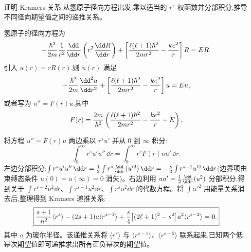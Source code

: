 \begin{question}
证明 Kramers 关系:从氢原子径向方程出发,乘以适当的 $r^s$ 权函数并分部积分,推导不同径向期望值之间的递推关系。
\end{question}
\begin{solution}
氢原子的径向方程为
\[
-{\hbar^2\over2m}{1\over r^2}{\dd\over\dd r}\left(r^2{\dd R\over\dd r}\right)
+ \left[{\ell(\ell+1)\hbar^2\over2mr^2} - {ke^2\over r}\right]R = E R.
\]
引入 $u(r)=rR(r)$,则 $u(r)$ 满足
\[
-{\hbar^2\over2m}{\dd^2 u\over\dd r^2} + \left[{\ell(\ell+1)\hbar^2\over2mr^2} - {ke^2\over r}\right]u = E u,
\]
或者写为 $u'' = F(r)u$,其中
\[
F(r) = {2m\over\hbar^2}\left({\ell(\ell+1)\hbar^2\over2mr^2} - {ke^2\over r} - E\right).
\]

将方程 $u'' = F(r)u$ 两边乘以 $r^s u'$ 并从 $0$ 到 $\infty$ 积分:
\[
\int_0^\infty r^s u' u''\,\dd r = \int_0^\infty r^s F(r) u u'\,\dd r.
\]
左边分部积分:$\int r^s u' u''\,\dd r = {1\over2}\int r^s {\dd\over\dd r}(u'^2)\,\dd r = -{s\over2}\int r^{s-1} u'^2\,\dd r$(边界项由束缚态条件 $u(0)=u(\infty)=0$ 消失)。右边利用 $u u' = {1\over2}{\dd\over\dd r}(u^2)$ 分部积分,得到关于 $\int r^{s-2}u^2\dd r$、$\int r^{s-1}u^2\dd r$、$\int r^{s}u^2\dd r$ 的代数方程。将 $\int u'^2$ 用能量关系消去后,整理得到 Kramers 递推关系:
\[
\boxed{{s+1\over n^2}\langle r^s\rangle - (2s+1)a\langle r^{s-1}\rangle + {s\over4}\bigl[(2\ell+1)^2-s^2\bigr]a^2\langle r^{s-2}\rangle = 0.}
\]
其中 $a$ 为玻尔半径。该递推关系将 $\langle r^s\rangle$ 与 $\langle r^{s-1}\rangle$、$\langle r^{s-2}\rangle$ 联系起来,已知两个低幂次期望值即可递推求出所有正负幂次的期望值。
\end{solution}

